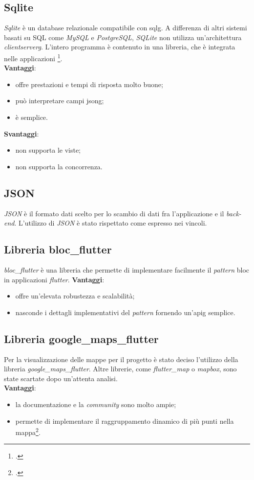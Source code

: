 \subsection{Sqlite}
\textit{Sqlite} è un database relazionale compatibile con \gls{sqlg}. A differenza di altri sistemi basati su SQL come \textit{MySQL} e \textit{PostgreSQL}, \textit{SQLite} non utilizza un'architettura \textit{clientserverg}. L'intero programma è contenuto in una libreria, che è integrata nelle applicazioni \footcite{site:sqlite-doc}.\\
\noindent \textbf{Vantaggi}:
\begin{itemize}
    \item offre prestazioni e tempi di risposta molto buone;
    \item può interpretare campi \gls{jsong};
    \item è semplice.
\end{itemize}
\noindent \textbf{Svantaggi}:
\begin{itemize}
    \item non supporta le viste;
    \item non supporta la concorrenza.
\end{itemize}

\subsection{JSON} \textit{JSON} è il formato dati scelto per lo scambio di dati fra l'applicazione e il \textit{back-end}.
\noindent L'utilizzo di \textit{JSON} è stato rispettato come espresso nei vincoli.

\subsection{Libreria bloc\_flutter}
\textit{bloc\_flutter} è una libreria che permette di implementare facilmente il \textit{pattern} \gls{bloc} in applicazioni \textit{flutter}.
\noindent \textbf{Vantaggi}:
\begin{itemize}
    \item offre un'elevata robustezza e scalabilità;
    \item nasconde i dettagli implementativi del \textit{pattern} fornendo un'\gls{apig} semplice.
\end{itemize}

\subsection{Libreria google\_maps\_flutter}
Per la visualizzazione delle mappe per il progetto è stato deciso l'utilizzo della libreria \textit{google\_maps\_flutter}. Altre librerie, come \textit{flutter\_map} o \textit{mapbox}, sono state scartate dopo un'attenta analisi.\\
\noindent \textbf{Vantaggi}:
\begin{itemize}
    \item la documentazione e la \textit{community} sono molto ampie;
    \item permette di implementare il raggruppamento dinamico di più punti nella mappa\footcite{site:clustering-doc}.
\end{itemize}

